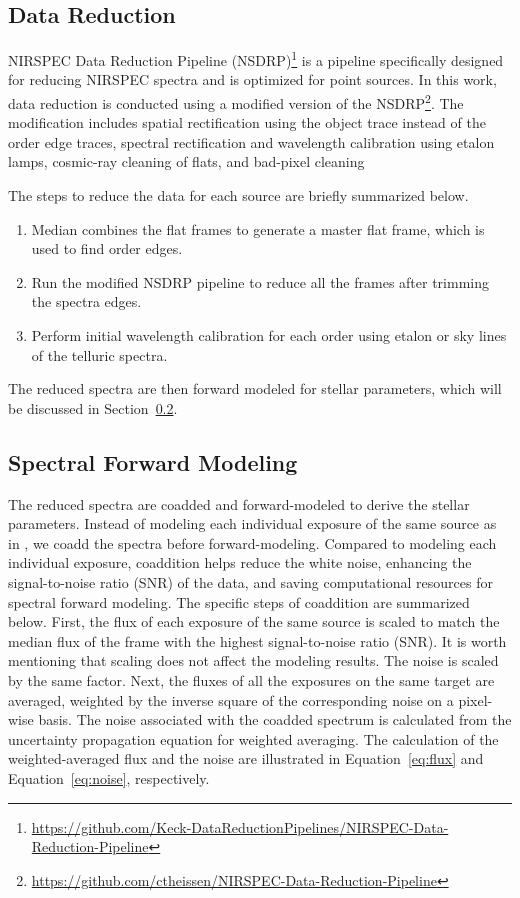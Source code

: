 \documentclass[12pt]{ucsddissertation}
\begin{document}
\begin{CJK*}{UTF8}{gbsn}
\subsection{Data Reduction}
\label{onc-subsec:reduction}
NIRSPEC Data Reduction Pipeline (NSDRP)\footnote{\url{https://github.com/Keck-DataReductionPipelines/NIRSPEC-Data-Reduction-Pipeline}} is a pipeline specifically designed for reducing NIRSPEC spectra and is optimized for point sources. In this work, data reduction is conducted using a modified version of the NSDRP\footnote{\url{https://github.com/ctheissen/NIRSPEC-Data-Reduction-Pipeline}}. The modification includes spatial rectification using the object trace instead of the order edge traces, spectral rectification and wavelength calibration using etalon lamps, cosmic-ray cleaning of flats, and bad-pixel cleaning \citep[see][for details]{Hsu-2021-paper, Hsu-2021-code}

The steps to reduce the data for each source are briefly summarized below.
\begin{enumerate}
    \item Median combines the flat frames to generate a master flat frame, which is used to find order edges.
    \item Run the modified NSDRP pipeline to reduce all the frames after trimming the spectra edges.
    \item Perform initial wavelength calibration for each order using etalon or sky lines of the telluric spectra.
\end{enumerate}

The reduced spectra are then forward modeled for stellar parameters, which will be discussed in Section~\ref{onc-subsec:modeling}.


\subsection{Spectral Forward Modeling}
\label{onc-subsec:modeling}
The reduced spectra are coadded and forward-modeled to derive the stellar parameters. Instead of modeling each individual exposure of the same source as in , we coadd the spectra before forward-modeling. Compared to modeling each individual exposure, coaddition helps reduce the white noise, enhancing the signal-to-noise ratio (SNR) of the data, and saving computational resources for spectral forward modeling. The specific steps of coaddition are summarized below. First, the flux of each exposure of the same source is scaled to match the median flux of the frame with the highest signal-to-noise ratio (SNR). It is worth mentioning that scaling does not affect the modeling results. The noise is scaled by the same factor. Next, the fluxes of all the exposures on the same target are averaged, weighted by the inverse square of the corresponding noise on a pixel-wise basis. The noise associated with the coadded spectrum is calculated from the uncertainty propagation equation for weighted averaging. The calculation of the weighted-averaged flux and the noise are illustrated in Equation~\ref{eq:flux} and Equation~\ref{eq:noise}, respectively.



\end{CJK*}
\end{document}
